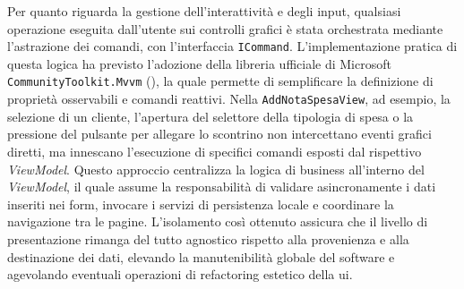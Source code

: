 Per quanto riguarda la gestione dell'interattività e degli input, qualsiasi operazione eseguita dall'utente sui controlli grafici è stata orchestrata mediante l'astrazione dei comandi, con l'interfaccia \texttt{ICommand}. L'implementazione pratica di questa logica ha previsto l'adozione della libreria ufficiale di Microsoft \texttt{CommunityToolkit.Mvvm} (\cite{site:community-toolkit-mvvm}), la quale permette di semplificare la definizione di proprietà osservabili e comandi reattivi. Nella \texttt{AddNotaSpesaView}, ad esempio, la selezione di un cliente, l'apertura del selettore della tipologia di spesa o la pressione del pulsante per allegare lo scontrino non intercettano eventi grafici diretti, ma innescano l'esecuzione di specifici comandi esposti dal rispettivo \textit{ViewModel}. Questo approccio centralizza la logica di business all'interno del \textit{ViewModel}, il quale assume la responsabilità di validare asincronamente i dati inseriti nei form, invocare i servizi di persistenza locale e coordinare la navigazione tra le pagine. L'isolamento così ottenuto assicura che il livello di presentazione rimanga del tutto agnostico rispetto alla provenienza e alla destinazione dei dati, elevando la manutenibilità globale del software e agevolando eventuali operazioni di refactoring estetico della \gls{ui}.

